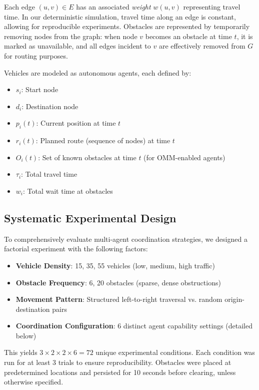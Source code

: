 \documentclass[conference]{IEEEtran}
\begin{document}
Each edge $(u, v) \in E$ has an associated \textit{weight} $w(u,v)$ representing travel time. In our deterministic simulation, travel time along an edge is constant, allowing for reproducible experiments. Obstacles are represented by temporarily removing nodes from the graph: when node $v$ becomes an obstacle at time $t$, it is marked as unavailable, and all edges incident to $v$ are effectively removed from $G$ for routing purposes.

Vehicles are modeled as autonomous agents, each defined by:
\begin{itemize}
    \item $s_i$: Start node
    \item $d_i$: Destination node
    \item $p_i(t)$: Current position at time $t$
    \item $r_i(t)$: Planned route (sequence of nodes) at time $t$
    \item $O_i(t)$: Set of known obstacles at time $t$ (for OMM-enabled agents)
    \item $\tau_i$: Total travel time
    \item $w_i$: Total wait time at obstacles
\end{itemize}

\subsection{Systematic Experimental Design}

To comprehensively evaluate multi-agent coordination strategies, we designed a factorial experiment with the following factors:

\begin{itemize}
    \item \textbf{Vehicle Density}: 15, 35, 55 vehicles (low, medium, high traffic)
    \item \textbf{Obstacle Frequency}: 6, 20 obstacles (sparse, dense obstructions)
    \item \textbf{Movement Pattern}: Structured left-to-right traversal vs. random origin-destination pairs
    \item \textbf{Coordination Configuration}: 6 distinct agent capability settings (detailed below)
\end{itemize}

This yields $3 \times 2 \times 2 \times 6 = 72$ unique experimental conditions. Each condition was run for at least 3 trials to ensure reproducibility. Obstacles were placed at predetermined locations and persisted for 10 seconds before clearing, unless otherwise specified.
\end{document}
